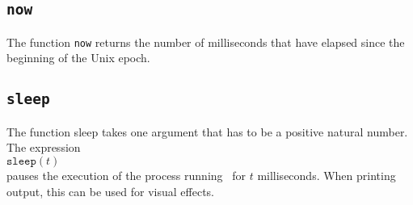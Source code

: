 \subsection{\texttt{now}}
The function \texttt{now}  returns the number of milliseconds that have elapsed since
the beginning of the Unix epoch.

\subsection{\texttt{sleep}}
The function sleep takes one argument that has to be a positive natural number.  The expression
\\[0.2cm]
\hspace*{1.3cm}
$\texttt{sleep}(t)$
\\[0.2cm]
pauses the execution of the process running \setlx\ for $t$ milliseconds.  When printing
output, this can be used for visual effects.


